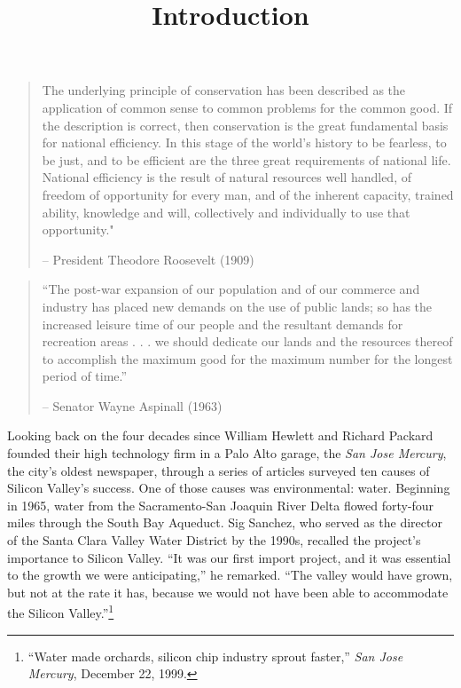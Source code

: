 \documentclass[11pt,article,oneside]{memoir}
\title{\bigskip \bigskip Introduction}
\author{\bigskip\Large }
\begin{document}
  

\setsansfont[Mapping=tex-text, BoldFont={* Bold SemiCondensed}, ItalicFont={* Semibold SemiCondensed Italic}]{Myriad Pro}
\setmonofont[Mapping=tex-text,Scale=MatchLowercase]{Consolas}


\setsansfont[Mapping=tex-text]{Minion Pro} 
\setmonofont[Mapping=tex-text,Scale=0.8]{Consolas}
\pagestyle{kjh}


\maketitle


\begin{quote}
The underlying principle of conservation has been described as the
application of common sense to common problems for the common good. If
the description is correct, then conservation is the great fundamental
basis for national efficiency. In this stage of the world's history to
be fearless, to be just, and to be efficient are the three great
requirements of national life. National efficiency is the result of
natural resources well handled, of freedom of opportunity for every man,
and of the inherent capacity, trained ability, knowledge and will,
collectively and individually to use that opportunity."

-- President Theodore Roosevelt (1909)
\end{quote}

\begin{quote}
``The post-war expansion of our population and of our commerce and
industry has placed new demands on the use of public lands; so has the
increased leisure time of our people and the resultant demands for
recreation areas . . . we should dedicate our lands and the resources
thereof to accomplish the maximum good for the maximum number for the
longest period of time.''

-- Senator Wayne Aspinall (1963)
\end{quote}

Looking back on the four decades since William Hewlett and Richard
Packard founded their high technology firm in a Palo Alto garage, the
\emph{San Jose Mercury}, the city's oldest newspaper, through a series
of articles surveyed ten causes of Silicon Valley's success. One of
those causes was environmental: water. Beginning in 1965, water from the
Sacramento-San Joaquin River Delta flowed forty-four miles through the
South Bay Aqueduct. Sig Sanchez, who served as the director of the Santa
Clara Valley Water District by the 1990s, recalled the project's
importance to Silicon Valley. ``It was our first import project, and it
was essential to the growth we were anticipating,'' he remarked. ``The
valley would have grown, but not at the rate it has, because we would
not have been able to accommodate the Silicon Valley.''\footnote{``Water
  made orchards, silicon chip industry sprout faster,'' \emph{San Jose
  Mercury}, December 22, 1999.}
\end{document}
